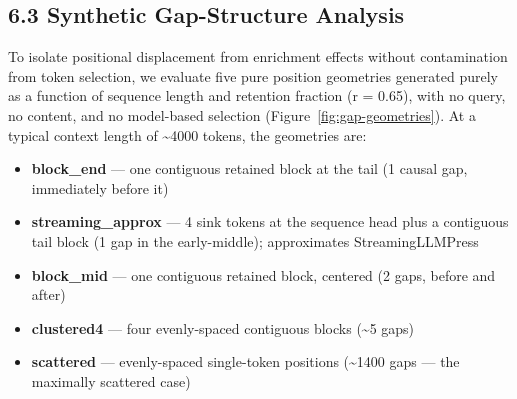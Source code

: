 \documentclass[10pt,letterpaper]{article}
\providecommand{\tightlist}{%
  \setlength{\itemsep}{0pt}\setlength{\parskip}{0pt}}
\begin{document}
\hypertarget{synthetic-gap-structure-analysis}{%
\subsection{6.3 Synthetic Gap-Structure
Analysis}\label{synthetic-gap-structure-analysis}}

To isolate positional displacement from enrichment effects without
contamination from token selection, we evaluate five pure position
geometries generated purely as a function of sequence length and
retention fraction (r = 0.65), with no query, no content, and no
model-based selection (Figure~\ref{fig:gap-geometries}). At a typical
context length of \textasciitilde4000 tokens, the geometries are:

\begin{itemize}
\tightlist
\item
  \textbf{block\_end} --- one contiguous retained block at the tail (1
  causal gap, immediately before it)
\item
  \textbf{streaming\_approx} --- 4 sink tokens at the sequence head
  plus a contiguous tail block (1 gap in the early-middle); approximates
  StreamingLLMPress
\item
  \textbf{block\_mid} --- one contiguous retained block, centered (2
  gaps, before and after)
\item
  \textbf{clustered4} --- four evenly-spaced contiguous blocks
  (\textasciitilde5 gaps)
\item
  \textbf{scattered} --- evenly-spaced single-token positions
  (\textasciitilde1400 gaps --- the maximally scattered case)
\end{itemize}
\end{document}
